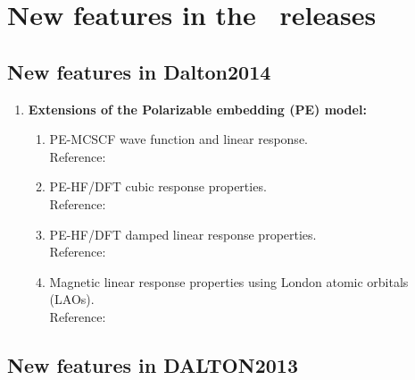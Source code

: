 \chapter{New features in the \dalton\ releases}

\section{New features in Dalton2014}

\begin{enumerate}
\item{\bf Extensions of the Polarizable embedding (PE) model:}
\begin{enumerate}
 \item{PE-MCSCF wave function and linear response.} \\
  Reference:  \cite{pemcscf}
 \item{PE-HF/DFT cubic response properties.} \\
  Reference:  \cite{pemodel}
 \item{PE-HF/DFT damped linear response properties.} \\
  Reference:  \cite{pecpp}
 \item{Magnetic linear response properties using London atomic orbitals (LAOs).} \\
  Reference:  \cite{pelao}
\end{enumerate}

\end{enumerate}


\section{New features in DALTON2013}

